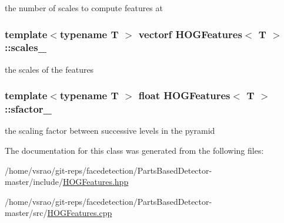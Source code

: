 the number of scales to compute features at 

\hypertarget{classHOGFeatures_a27490a8c33c7ffbfdeedafc5af0ad544}{
\subsubsection[{scales\-\_\-}]{\setlength{\rightskip}{0pt plus 5cm}template$<$typename T $>$ {\bf vectorf} {\bf H\-O\-G\-Features}$<$ T $>$\-::scales\-\_\-\hspace{0.3cm}{\ttfamily [private]}}}\label{classHOGFeatures_a27490a8c33c7ffbfdeedafc5af0ad544}


the scales of the features 

\hypertarget{classHOGFeatures_a45b232ca94e93b4f30d342374e62578f}{
\subsubsection[{sfactor\-\_\-}]{\setlength{\rightskip}{0pt plus 5cm}template$<$typename T $>$ float {\bf H\-O\-G\-Features}$<$ T $>$\-::sfactor\-\_\-\hspace{0.3cm}{\ttfamily [private]}}}\label{classHOGFeatures_a45b232ca94e93b4f30d342374e62578f}


the scaling factor between successive levels in the pyramid 



The documentation for this class was generated from the following files\-:\begin{DoxyCompactItemize}
\item 
/home/vsrao/git-\/reps/facedetection/\-Parts\-Based\-Detector-\/master/include/\hyperlink{HOGFeatures_8hpp}{H\-O\-G\-Features.\-hpp}\item 
/home/vsrao/git-\/reps/facedetection/\-Parts\-Based\-Detector-\/master/src/\hyperlink{HOGFeatures_8cpp}{H\-O\-G\-Features.\-cpp}\end{DoxyCompactItemize}
